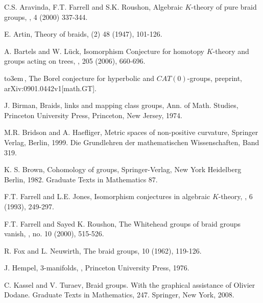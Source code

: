 \documentclass[12pt]{amsart}
\numberwithin{equation}{section}
\begin{document}

\ifx{}

\fi\begin{thebibliography}{60}

C.S. Aravinda, F.T. Farrell and S.K. Roushon,
\newblock Algebraic $K$-theory of pure braid groups, 
,  4 (2000) 337-344.

E. Artin,
\newblock Theory of braids,
 (2) 48 (1947), 101-126.

A. Bartels and W. L\"{u}ck,
\newblock Isomorphism Conjecture for homotopy $K$-theory and groups acting 
on trees,
, 205 (2006), 660-696.

{\leavevmode\hbox to3em{\hrulefill}\,},
\newblock The Borel conjecture for hyperbolic and 
$CAT(0)$-groups, preprint, arXiv:0901.0442v1[math.GT].

J. Birman,
\newblock Braids, links and mapping class groups, Ann. of Math. Studies, 
\newblock Princeton University Press, Princeton, New Jersey, 1974.

M.R. Bridson and A. Haefliger,
\newblock Metric spaces of non-positive curvature,
\newblock Springer Verlag, Berlin, 1999. Die Grundlehren der 
mathematischen Wissenschaften, Band 319.

K. S. Brown, 
\newblock Cohomology of groups,
\newblock Springer-Verlag, New York Heidelberg Berlin, 1982. Graduate 
Texts in Mathematics 87.

F.T. Farrell and L.E. Jones,
\newblock Isomorphism conjectures in algebraic $K$-theory, 
, 6 (1993), 249-297.

F.T. Farrell and Sayed K. Roushon,
\newblock The Whitehead groups of braid groups vanish, 
, no. 10 (2000), 515-526.

R. Fox and L. Neuwirth, 
\newblock The braid groups, 
 10 (1962), 119-126.

J. Hempel,
\newblock $3$-manifolds, 
,
\newblock Princeton University Press, 1976.

C. Kassel and V. Turaev,
\newblock Braid groups. With the graphical assistance of Olivier Dodane. 
\newblock Graduate Texts in Mathematics, 247. Springer, New York, 2008.


\end{thebibliography}
\end{document}
